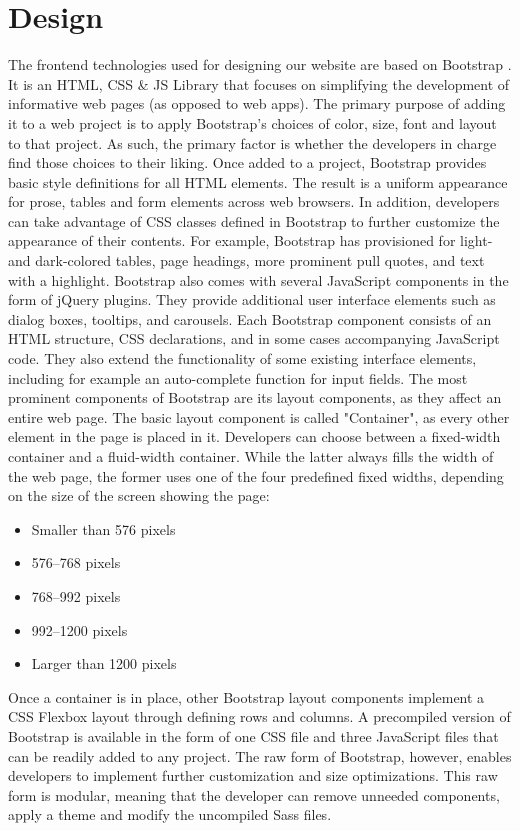 \section{Design}


The frontend technologies used for designing our website are based on Bootstrap \cite{bootstrap}. It is an HTML, CSS \& JS Library that focuses on simplifying the development of informative web pages (as opposed to web apps). The primary purpose of adding it to a web project is to apply Bootstrap's choices of color, size, font and layout to that project. As such, the primary factor is whether the developers in charge find those choices to their liking. Once added to a project, Bootstrap provides basic style definitions for all HTML elements. The result is a uniform appearance for prose, tables and form elements across web browsers. In addition, developers can take advantage of CSS classes defined in Bootstrap to further customize the appearance of their contents. For example, Bootstrap has provisioned for light- and dark-colored tables, page headings, more prominent pull quotes, and text with a highlight.
Bootstrap also comes with several JavaScript components in the form of jQuery plugins. They provide additional user interface elements such as dialog boxes, tooltips, and carousels. Each Bootstrap component consists of an HTML structure, CSS declarations, and in some cases accompanying JavaScript code. They also extend the functionality of some existing interface elements, including for example an auto-complete function for input fields.
The most prominent components of Bootstrap are its layout components, as they affect an entire web page. The basic layout component is called "Container", as every other element in the page is placed in it. Developers can choose between a fixed-width container and a fluid-width container. While the latter always fills the width of the web page, the former uses one of the four predefined fixed widths, depending on the size of the screen showing the page:
\begin{itemize}
	\item Smaller than 576 pixels
	\item 576–768 pixels
	\item 768–992 pixels
	\item 992–1200 pixels
	\item Larger than 1200 pixels
\end{itemize}
Once a container is in place, other Bootstrap layout components implement a CSS Flexbox layout through defining rows and columns.
A precompiled version of Bootstrap is available in the form of one CSS file and three JavaScript files that can be readily added to any project. The raw form of Bootstrap, however, enables developers to implement further customization and size optimizations. This raw form is modular, meaning that the developer can remove unneeded components, apply a theme and modify the uncompiled Sass files.

